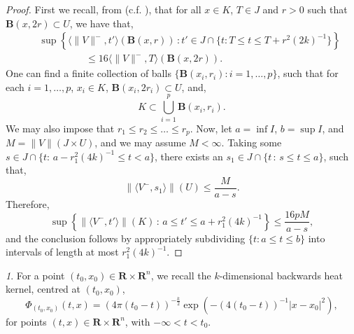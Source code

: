 \documentclass{article}
\theoremstyle{plain}
\theoremstyle{definition}
\theoremstyle{plain}
\theoremstyle{remark}
\newtheorem{propparagraph}[theorem]{}
\theoremstyle{remark}
\theoremstyle{plain}
\begin{document}
 \begin{proof}
     First we recall, from \cite[3.10.1]{LW-Space-Time-GrassmannMeasureBrakkeFlow} (c.f. \cite[3.3]{Lahiri2017EqualityOT}), that for all $x \in K$, $T \in J$ and $r > 0$ such that $\mathbf{B} (x, 2 r) \subset U$, we have that, 
    \begin{eqnarray*}
        && \sup \left\{ \langle \| V \|^{-}, t' \rangle (\mathbf{B} (x, r)) \, \colon t' \in J \cap \{t \colon T \leq t \leq T + r^{2} (2 k)^{-1}\} \right\} \\ 
        && \hspace{2cm} \leq 16 \langle \| V \|^{-}, T \rangle (\mathbf{B} (x, 2 r)).
    \end{eqnarray*}
    One can find a finite collection of balls $\{ \mathbf{B} (x_{i}, r_{i}) \colon i =1, \ldots, p\}$, such that for each $i = 1, \ldots, p$, $x_{i} \in K$, $\mathbf{B} (x_{i}, 2 r_{i}) \subset U$, and, 
    \begin{equation*}
        \textstyle K \subset \bigcup_{i = 1}^{p} \mathbf{B} (x_{i}, r_{i}).
    \end{equation*}
    We may also impose that $r_{1} \leq r_{2} \leq \ldots \leq r_{p}$.
    Now, let $a = \inf I$, $b = \sup I$, and $M = \| V \| (J \times U)$, and we may assume $M<\infty$. Taking some $s \in J \cap \{ t \colon \, a - r_{1}^{2} (4 k)^{-1} \leq t< a \}$, there exists an $s_{1} \in J \cap \{ t  \, \colon \, s \leq t \leq a \}$, such that, 
    \begin{equation*}
        \| \langle V^{-}, s_{1} \rangle \| (U) \leq \frac{M}{a - s}. 
    \end{equation*}
    Therefore, 
    \begin{equation*}
        \sup \left\{ \| \langle V^{-}, t' \rangle \| (K) \, \colon \, a \leq t' \leq a + r_{1}^{2}(4k)^{-1} \right\} \leq \frac{16 p M}{a - s},
    \end{equation*}
    and the conclusion follows by appropriately subdividing $\{ t : a \leq t \leq b\}$ into intervals of length at most $r_{1}^{2} (4 k)^{-1}$.
 \end{proof}

\begin{propparagraph}
    For a point $(t_{0}, x_{0}) \in \mathbf{R} \times \mathbf{R}^{n}$, we recall the $k$-dimensional backwards heat kernel, centred at $(t_{0}, x_{0})$,
    \begin{equation*}
        \Phi_{(t_{0}, x_{0})} (t, x) = (4 \pi (t_{0} - t))^{-\frac{k}{2}} \exp (- (4 (t_{0} - t))^{-1} |x - x_{0}|^{2}),
    \end{equation*}
    for points $(t, x) \in \mathbf{R} \times \mathbf{R}^{n}$, with $- \infty < t < t_{0}$.
\end{propparagraph}
\end{document}
